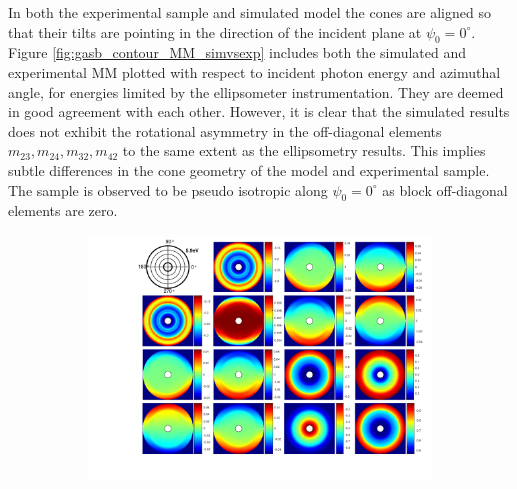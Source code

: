 In both the experimental sample and simulated model the cones are aligned so that their tilts are pointing in the direction of the incident plane at $\psi_0=0^\circ$. Figure \ref{fig:gasb_contour_MM_simvsexp} includes both the simulated and experimental MM plotted with respect to incident photon energy and azimuthal angle, for energies limited by the ellipsometer instrumentation. They are deemed in good agreement with each other. However, it is clear that the simulated results does not exhibit the rotational asymmetry in the off-diagonal elements $m_{23}, m_{24}, m_{32}, m_{42}$ to the same extent as the ellipsometry results. This implies subtle differences in the cone geometry of the model and experimental sample. The sample is observed to be pseudo isotropic along $\psi_0=0^\circ$ as block off-diagonal elements are zero.
\begin{figure}
    \begin{subfigure}{\textwidth}
        \centering
        \includegraphics[width=\linewidth, trim=3.6cm 1.5cm 0cm 0cm, clip]{figures/ch4/gasb/contour/GaSbCones_contour_MM.pdf}   
    \end{subfigure}
    

\end{figure}
